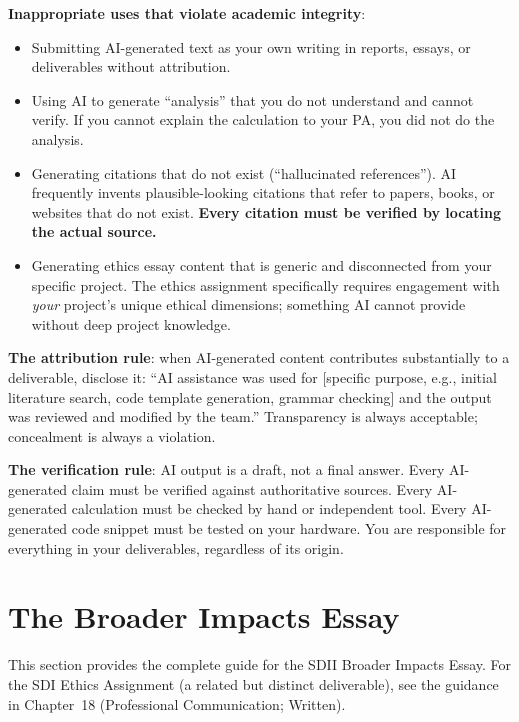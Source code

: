 \textbf{Inappropriate uses that violate academic integrity}:
\begin{itemize}[nosep,leftmargin=1.5em]
\item Submitting AI-generated text as your own writing in reports, essays, or deliverables without attribution.
\item Using AI to generate ``analysis'' that you do not understand and cannot verify. If you cannot explain the calculation to your PA, you did not do the analysis.
\item Generating citations that do not exist (``hallucinated references''). AI frequently invents plausible-looking citations that refer to papers, books, or websites that do not exist. \textbf{Every citation must be verified by locating the actual source.}
\item Generating ethics essay content that is generic and disconnected from your specific project. The ethics assignment specifically requires engagement with \emph{your} project's unique ethical dimensions; something AI cannot provide without deep project knowledge.
\end{itemize}

\textbf{The attribution rule}: when AI-generated content contributes substantially to a deliverable, disclose it: ``AI assistance was used for [specific purpose, e.g., initial literature search, code template generation, grammar checking] and the output was reviewed and modified by the team.'' Transparency is always acceptable; concealment is always a violation.

\textbf{The verification rule}: AI output is a draft, not a final answer. Every AI-generated claim must be verified against authoritative sources. Every AI-generated calculation must be checked by hand or independent tool. Every AI-generated code snippet must be tested on your hardware. You are responsible for everything in your deliverables, regardless of its origin.



\section{The Broader Impacts Essay}
\begin{keyconceptbox}
This section provides the complete guide for the SDII Broader Impacts Essay. For the SDI Ethics Assignment (a related but distinct deliverable), see the guidance in Chapter~18 (Professional Communication; Written).
\end{keyconceptbox}

